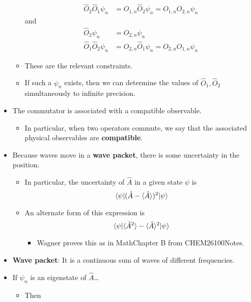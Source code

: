 \documentclass[../notes.tex]{subfiles}
\begin{document}
\begin{itemize}
\begin{itemize}
\begin{align*}
            \hat{O}_2\hat{O}_1\psi_n &= O_{1,n}\hat{O}_2\psi_n = O_{1,n}O_{2,n}\psi_n
        \end{align*}
        and
        \begin{align*}
            \hat{O}_2\psi_n &= O_{2,n}\psi_n\\
            \hat{O}_1\hat{O}_2\psi_n &= O_{2,n}\hat{O}_1\psi_n = O_{2,n}O_{1,n}\psi_n
        \end{align*}
        \item These are the relevant constraints.
        \item If such a $\psi_n$ exists, then we can determine the values of $\hat{O}_1,\hat{O}_2$ simultaneously to infinite precision.
    \end{itemize}
    \item The commutator is associated with a compatible observable.
    \begin{itemize}
        \item In particular, when two operators commute, we say that the associated physical observables are \textbf{compatible}.
    \end{itemize}
    \item Because waves move in a \textbf{wave packet}, there is some uncertainty in the position.
    \begin{itemize}
        \item In particular, the uncertainty of $\hat{A}$ in a given state $\psi$ is
        \begin{equation*}
            \ev{(\hat{A}-\Exp{\hat{A}})^2}{\psi}
        \end{equation*}
        \item An alternate form of this expression is
        \begin{equation*}
            \ev{\Exp{\hat{A}^2}-\Exp{\hat{A}}^2}{\psi}
        \end{equation*}
        \begin{itemize}
            \item Wagner proves this as in MathChapter B from CHEM26100Notes.
        \end{itemize}
    \end{itemize}
    \item \textbf{Wave packet}: It is a continuous sum of waves of different frequencies.
    \item If $\psi_n$ is an eigenstate of $\hat{A}$\dots
    \begin{itemize}
        \item Then

\end{itemize}
\end{itemize}
\end{document}
